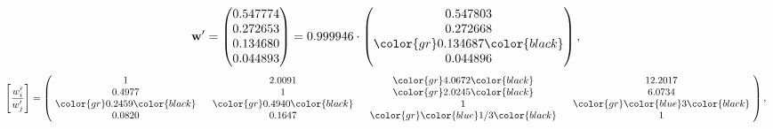 \begin{example}
\begin{equation*}
\mathbf{w}^{\prime} =
\begin{pmatrix}
0.547774\\
0.272653\\
0.134680\\
0.044893
\end{pmatrix} =
0.999946\cdot
\begin{pmatrix}
0.547803\\
0.272668\\
\color{gr} 0.134687\color{black} \\
0.044896
\end{pmatrix},
\end{equation*}
\begin{equation*}
\left[ \frac{{w}^{\prime}_i}{{w}^{\prime}_j} \right] =
\begin{pmatrix}
$\,\,$ 1 $\,\,$ & $\,\,$2.0091$\,\,$ & $\,\,$\color{gr} 4.0672\color{black} $\,\,$ & $\,\,$12.2017$\,\,$ \\
$\,\,$0.4977$\,\,$ & $\,\,$ 1 $\,\,$ & $\,\,$\color{gr} 2.0245\color{black} $\,\,$ & $\,\,$6.0734  $\,\,$ \\
$\,\,$\color{gr} 0.2459\color{black} $\,\,$ & $\,\,$\color{gr} 0.4940\color{black} $\,\,$ & $\,\,$ 1 $\,\,$ & $\,\,$\color{gr} \color{blue} 3\color{black}  $\,\,$ \\
$\,\,$0.0820$\,\,$ & $\,\,$0.1647$\,\,$ & $\,\,$\color{gr} \color{blue}  1/3\color{black} $\,\,$ & $\,\,$ 1  $\,\,$ \\
\end{pmatrix},
\end{equation*}
\end{example}
\newpage
